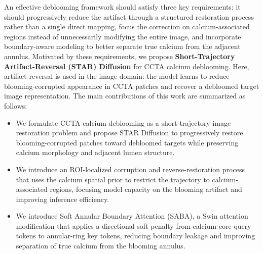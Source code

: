 \documentclass[singleLetter,times]{sagej}
\begin{document}
An effective deblooming framework should satisfy three key requirements: it should progressively reduce the artifact through a structured restoration process rather than a single direct mapping, focus the correction on calcium-associated regions instead of unnecessarily modifying the entire image, and incorporate boundary-aware modeling to better separate true calcium from the adjacent annulus. Motivated by these requirements, we propose \textbf{Short-Trajectory Artifact-Reversal (STAR) Diffusion} for CCTA calcium deblooming. Here, artifact-reversal is used in the image domain: the model learns to reduce blooming-corrupted appearance in CCTA patches and recover a debloomed target image representation.
The main contributions of this work are summarized as follows:
\begin{itemize}
    \item We formulate CCTA calcium deblooming as a short-trajectory image restoration problem and propose STAR Diffusion to progressively restore blooming-corrupted patches toward debloomed targets while preserving calcium morphology and adjacent lumen structure.

    \item We introduce an ROI-localized corruption and reverse-restoration process that uses the calcium spatial prior to restrict the trajectory to calcium-associated regions, focusing model capacity on the blooming artifact and improving inference efficiency.

    \item We introduce Soft Annular Boundary Attention (SABA), a Swin attention modification that applies a directional soft penalty from calcium-core query tokens to annular-ring key tokens, reducing boundary leakage and improving separation of true calcium from the blooming annulus.
\end{itemize}
\end{document}
